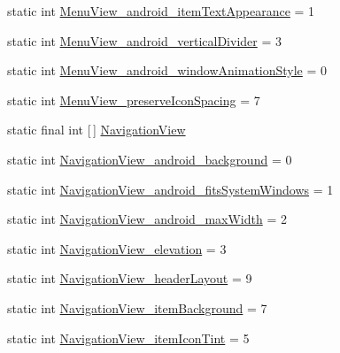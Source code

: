 \begin{DoxyCompactItemize}
\item 
static int \hyperlink{classandroid_1_1support_1_1v7_1_1cardview_1_1R_1_1styleable_a0f18c10021a7e3cf802a23e020c87698}{Menu\+View\+\_\+android\+\_\+item\+Text\+Appearance} = 1
\item 
static int \hyperlink{classandroid_1_1support_1_1v7_1_1cardview_1_1R_1_1styleable_a53166c0c74f66a1053b4e2b8ed449af3}{Menu\+View\+\_\+android\+\_\+vertical\+Divider} = 3
\item 
static int \hyperlink{classandroid_1_1support_1_1v7_1_1cardview_1_1R_1_1styleable_a756c77c2bece7262d2b3864bd0855483}{Menu\+View\+\_\+android\+\_\+window\+Animation\+Style} = 0
\item 
static int \hyperlink{classandroid_1_1support_1_1v7_1_1cardview_1_1R_1_1styleable_a034320428c37d4f5c21c75f35207c020}{Menu\+View\+\_\+preserve\+Icon\+Spacing} = 7
\item 
static final int \mbox{[}$\,$\mbox{]} \hyperlink{classandroid_1_1support_1_1v7_1_1cardview_1_1R_1_1styleable_aab4216e563b2e19093e1d57494734202}{Navigation\+View}
\item 
static int \hyperlink{classandroid_1_1support_1_1v7_1_1cardview_1_1R_1_1styleable_a94e2a218f669083b762cff03f9744e3b}{Navigation\+View\+\_\+android\+\_\+background} = 0
\item 
static int \hyperlink{classandroid_1_1support_1_1v7_1_1cardview_1_1R_1_1styleable_aa6f714233e453699e4d54ad9df87c26f}{Navigation\+View\+\_\+android\+\_\+fits\+System\+Windows} = 1
\item 
static int \hyperlink{classandroid_1_1support_1_1v7_1_1cardview_1_1R_1_1styleable_ac1b3e741214cbc01ba4889dad538b752}{Navigation\+View\+\_\+android\+\_\+max\+Width} = 2
\item 
static int \hyperlink{classandroid_1_1support_1_1v7_1_1cardview_1_1R_1_1styleable_af1ff40b9d01cd7c460e4f0b93cbb4bdf}{Navigation\+View\+\_\+elevation} = 3
\item 
static int \hyperlink{classandroid_1_1support_1_1v7_1_1cardview_1_1R_1_1styleable_a295bd44f7203a8812e422aecbcc036d4}{Navigation\+View\+\_\+header\+Layout} = 9
\item 
static int \hyperlink{classandroid_1_1support_1_1v7_1_1cardview_1_1R_1_1styleable_a1a21d53170287aa58f15ebb0407ff257}{Navigation\+View\+\_\+item\+Background} = 7
\item 
static int \hyperlink{classandroid_1_1support_1_1v7_1_1cardview_1_1R_1_1styleable_a2ab0ca375d97bd7ddedbe29e6eee2165}{Navigation\+View\+\_\+item\+Icon\+Tint} = 5
\item 

\end{DoxyCompactItemize}
